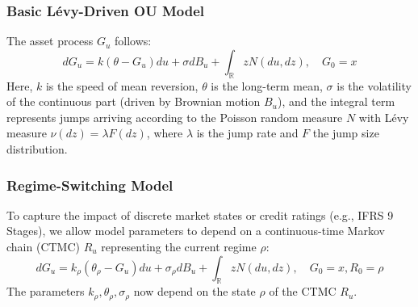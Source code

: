 \documentclass[11pt,twoside,openright]{report}
\begin{document}
\subsubsection{Basic Lévy-Driven OU Model}
The asset process $G_u$ follows:
$$ dG_u = k(\theta - G_u)du + \sigma dB_u + \int_{\mathbb{R}} z N(du, dz), \quad G_0 = x $$
Here, $k$ is the speed of mean reversion, $\theta$ is the long-term mean, $\sigma$ is the volatility of the continuous part (driven by Brownian motion $B_u$), and the integral term represents jumps arriving according to the Poisson random measure $N$ with Lévy measure $\nu(dz) = \lambda F(dz)$, where $\lambda$ is the jump rate and $F$ the jump size distribution.

\subsubsection{Regime-Switching Model}
To capture the impact of discrete market states or credit ratings (e.g., IFRS 9 Stages), we allow model parameters to depend on a continuous-time Markov chain (CTMC) $R_u$ representing the current regime $\rho$:
$$ dG_u = k_{\rho}(\theta_{\rho} - G_u)du + \sigma_{\rho} dB_u + \int_{\mathbb{R}} z N(du, dz), \quad G_0 = x, R_0 = \rho $$
The parameters $k_{\rho}, \theta_{\rho}, \sigma_{\rho}$ now depend on the state $\rho$ of the CTMC $R_u$.


\end{document}
